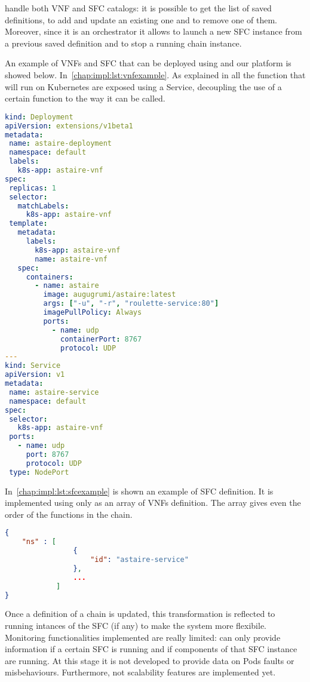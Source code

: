 \harbor{} handle both VNF and SFC catalogs: it is possible to get the list of
saved definitions, to add and update an existing one and to remove one of them.
Moreover, since it is an orchestrator it allows to launch a new SFC instance
from a previous saved definition and to stop a running chain instance.

An example of VNFs and SFC that can be deployed using \harbor{} and our platform
is showed below. In~\ref{chap:impl:lst:vnfexample}. As explained in  all the function that will run on Kubernetes are exposed
using a Service, decoupling the use of a certain function to the way it can be
called.
\begin{lstlisting}[caption={Example of VNF definition}, captionpos=b,
                   language=yaml, label=chap:impl:lst:vnfexample]
kind: Deployment
apiVersion: extensions/v1beta1
metadata:
 name: astaire-deployment
 namespace: default
 labels:
   k8s-app: astaire-vnf
spec:
 replicas: 1
 selector:
   matchLabels:
     k8s-app: astaire-vnf
 template:
   metadata:
     labels:
       k8s-app: astaire-vnf
       name: astaire-vnf
   spec:
     containers:
       - name: astaire
         image: augugrumi/astaire:latest
         args: ["-u", "-r", "roulette-service:80"]
         imagePullPolicy: Always
         ports:
           - name: udp
             containerPort: 8767
             protocol: UDP
---
kind: Service
apiVersion: v1
metadata:
 name: astaire-service
 namespace: default
spec:
 selector:
   k8s-app: astaire-vnf
 ports:
   - name: udp
     port: 8767
     protocol: UDP
 type: NodePort
\end{lstlisting}

In~\ref{chap:impl:lst:sfcexample} is shown an example of SFC definition. It is
implemented using only as an array of VNFs definition. The array gives even the
order of the functions in the chain.
\begin{lstlisting}[caption={Example of SFC definition}, captionpos=b,
                   language=json, label=chap:impl:lst:sfcexample]
{
    "ns" : [
                {
                    "id": "astaire-service"
                },
                ...
            ]
}
\end{lstlisting}

Once a definition of a chain is updated, this transformation is reflected to
running intances of the SFC (if any) to make the system more flexibile.
Monitoring functionalities implemented are really limited: \harbor{} can only
provide information if a certain SFC is running and if components of that SFC
instance are running. At this stage it is not developed to provide data on Pods
faults or misbehaviours. Furthermore, not scalability features are implemented
yet.

